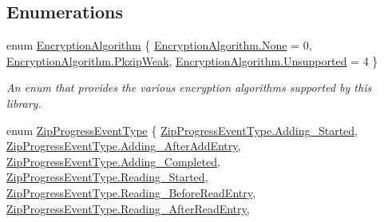 \subsection*{Enumerations}
\begin{DoxyCompactItemize}
\item 
enum \mbox{\hyperlink{namespace_super_tiled2_unity_1_1_ionic_1_1_zip_aa3f4e8aa12ef827ac72177a49b4e28e6}{Encryption\+Algorithm}} \{ \mbox{\hyperlink{namespace_super_tiled2_unity_1_1_ionic_1_1_zip_aa3f4e8aa12ef827ac72177a49b4e28e6a6adf97f83acf6453d4a6a4b1070f3754}{Encryption\+Algorithm.\+None}} = 0, 
\mbox{\hyperlink{namespace_super_tiled2_unity_1_1_ionic_1_1_zip_aa3f4e8aa12ef827ac72177a49b4e28e6ac1ce4469c40ac5817fb1c9c7909b18f6}{Encryption\+Algorithm.\+Pkzip\+Weak}}, 
\mbox{\hyperlink{namespace_super_tiled2_unity_1_1_ionic_1_1_zip_aa3f4e8aa12ef827ac72177a49b4e28e6ab4080bdf74febf04d578ff105cce9d3f}{Encryption\+Algorithm.\+Unsupported}} = 4
 \}
\begin{DoxyCompactList}\small\item\em An enum that provides the various encryption algorithms supported by this library. \end{DoxyCompactList}\item 
enum \mbox{\hyperlink{namespace_super_tiled2_unity_1_1_ionic_1_1_zip_a6584db8196e626ddfc455e74d31a841f}{Zip\+Progress\+Event\+Type}} \{ \newline
\mbox{\hyperlink{namespace_super_tiled2_unity_1_1_ionic_1_1_zip_a6584db8196e626ddfc455e74d31a841faadd4f41ec9305b334c5a247584c45898}{Zip\+Progress\+Event\+Type.\+Adding\+\_\+\+Started}}, 
\mbox{\hyperlink{namespace_super_tiled2_unity_1_1_ionic_1_1_zip_a6584db8196e626ddfc455e74d31a841faf97124a040226d9b24664e089d73e9b7}{Zip\+Progress\+Event\+Type.\+Adding\+\_\+\+After\+Add\+Entry}}, 
\mbox{\hyperlink{namespace_super_tiled2_unity_1_1_ionic_1_1_zip_a6584db8196e626ddfc455e74d31a841fab3c81a842a321d2e1f5cf86c4a01f5bc}{Zip\+Progress\+Event\+Type.\+Adding\+\_\+\+Completed}}, 
\mbox{\hyperlink{namespace_super_tiled2_unity_1_1_ionic_1_1_zip_a6584db8196e626ddfc455e74d31a841fabc902821c623f35074e9fa76d571d6c9}{Zip\+Progress\+Event\+Type.\+Reading\+\_\+\+Started}}, 
\newline
\mbox{\hyperlink{namespace_super_tiled2_unity_1_1_ionic_1_1_zip_a6584db8196e626ddfc455e74d31a841fa7eebe2e9801f788320609bcf3c864c29}{Zip\+Progress\+Event\+Type.\+Reading\+\_\+\+Before\+Read\+Entry}}, 
\mbox{\hyperlink{namespace_super_tiled2_unity_1_1_ionic_1_1_zip_a6584db8196e626ddfc455e74d31a841fa31f4741b407f9836d3e5c7d7a631f3ce}{Zip\+Progress\+Event\+Type.\+Reading\+\_\+\+After\+Read\+Entry}}, 

\end{DoxyCompactItemize}
